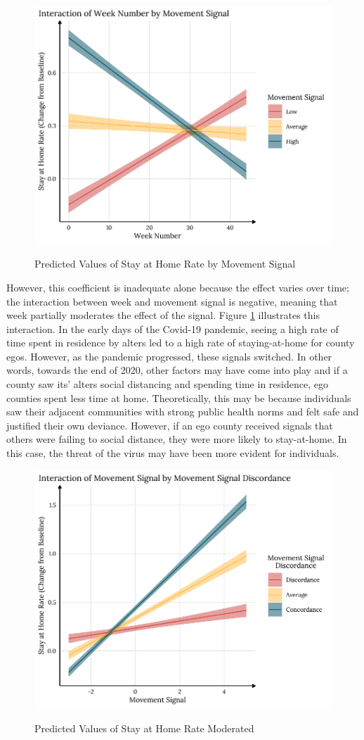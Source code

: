 \begin{figure}
{\centering \includegraphics[width=0.8\linewidth]{figs/paper3/plot-google-h2-1}}
\caption{Predicted Values of Stay at Home Rate by Movement Signal}\label{fig:plot-google-h2}
\end{figure}

However, this coefficient is inadequate alone because the effect varies over
time; the interaction between week and movement signal is negative, meaning that
week partially moderates the effect of the signal. Figure
\ref{fig:plot-google-h2} illustrates this interaction. In the early days of the
Covid-19 pandemic, seeing a high rate of time spent in residence by alters led
to a high rate of staying-at-home for county egos. However, as the pandemic
progressed, these signals switched. In other words, towards the end of 2020,
other factors may have come into play and if a county saw its' alters social
distancing and spending time in residence, ego counties spent less time at home.
Theoretically, this may be because individuals saw their adjacent communities
with strong public health norms and felt safe and justified their own deviance.
However, if an ego county received signals that
others were failing to social distance, they were more likely to stay-at-home.
In this case, the threat of the virus may have been more evident for
individuals.

\begin{figure}
{\centering \includegraphics[width=0.8\linewidth]{figs/paper3/plot-google-h3-1}}
\caption{Predicted Values of Stay at Home Rate Moderated}\label{fig:plot-google-h3}
\end{figure}

